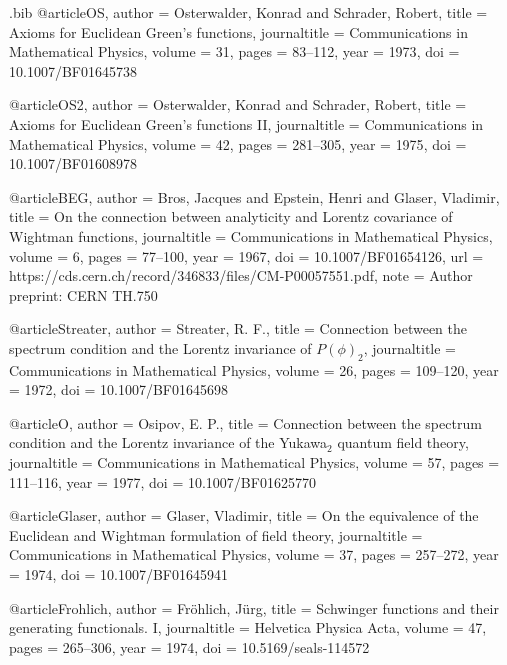 \begin{filecontents*}[overwrite]{\jobname.bib}
@article{OS,
  author = {Osterwalder, Konrad and Schrader, Robert},
  title = {Axioms for {Euclidean Green}'s functions},
  journaltitle = {Communications in Mathematical Physics},
  volume = {31},
  pages = {83--112},
  year = {1973},
  doi = {10.1007/BF01645738}
}

@article{OS2,
  author = {Osterwalder, Konrad and Schrader, Robert},
  title = {Axioms for {Euclidean Green}'s functions {II}},
  journaltitle = {Communications in Mathematical Physics},
  volume = {42},
  pages = {281--305},
  year = {1975},
  doi = {10.1007/BF01608978}
}

@article{BEG,
  author = {Bros, Jacques and Epstein, Henri and Glaser, Vladimir},
  title = {On the connection between analyticity and {Lorentz} covariance of {Wightman} functions},
  journaltitle = {Communications in Mathematical Physics},
  volume = {6},
  pages = {77--100},
  year = {1967},
  doi = {10.1007/BF01654126},
  url = {https://cds.cern.ch/record/346833/files/CM-P00057551.pdf},
  note = {Author preprint: CERN TH.750}
}

@article{Streater,
  author = {Streater, R. F.},
  title = {Connection between the spectrum condition and the {Lorentz} invariance of {$P(\phi)_2$}},
  journaltitle = {Communications in Mathematical Physics},
  volume = {26},
  pages = {109--120},
  year = {1972},
  doi = {10.1007/BF01645698}
}

@article{O,
  author = {Osipov, E. P.},
  title = {Connection between the spectrum condition and the {Lorentz} invariance of the {Yukawa}$_2$ quantum field theory},
  journaltitle = {Communications in Mathematical Physics},
  volume = {57},
  pages = {111--116},
  year = {1977},
  doi = {10.1007/BF01625770}
}


@article{Glaser,
  author = {Glaser, Vladimir},
  title = {On the equivalence of the {Euclidean} and {Wightman} formulation of field theory},
  journaltitle = {Communications in Mathematical Physics},
  volume = {37}, pages = {257--272}, year = {1974},
  doi = {10.1007/BF01645941}
}

@article{Frohlich,
  author = {Fr\"ohlich, J\"urg},
  title = {Schwinger functions and their generating functionals. {I}},
  journaltitle = {Helvetica Physica Acta},
  volume = {47}, pages = {265--306}, year = {1974},
  doi = {10.5169/seals-114572}
}


\end{filecontents*}
